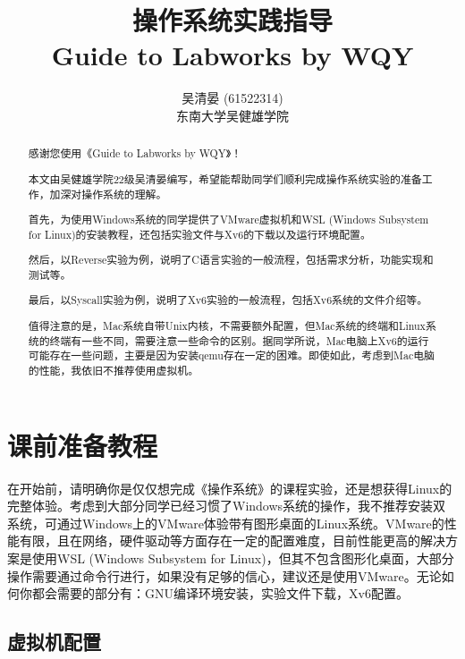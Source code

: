 \documentclass[fontset=ubuntu]{ctexart}
\title{操作系统实践指导 \\ \large Guide to Labworks by WQY}
\author{吴清晏 (61522314) \\ 东南大学吴健雄学院}
\date{}
\begin{document}
\maketitle
\thispagestyle{empty}

\newpage
\renewcommand{\abstractname}{\LARGE\textbf{前言}}
\begin{abstract}\large
    \vspace{1cm}
    \noindent 感谢您使用《Guide to Labworks by WQY》！

    本文由吴健雄学院22级吴清晏编写，希望能帮助同学们顺利完成操作系统实验的准备工作，加深对操作系统的理解。

    首先，为使用Windows系统的同学提供了VMware虚拟机和WSL (Windows Subsystem for Linux)的安装教程，还包括实验文件与Xv6的下载以及运行环境配置。

    然后，以Reverse实验为例，说明了C语言实验的一般流程，包括需求分析，功能实现和测试等。

    最后，以Syscall实验为例，说明了Xv6实验的一般流程，包括Xv6系统的文件介绍等。

    值得注意的是，Mac系统自带Unix内核，不需要额外配置，但Mac系统的终端和Linux系统的终端有一些不同，需要注意一些命令的区别。据同学所说，Mac电脑上Xv6的运行可能存在一些问题，主要是因为安装qemu存在一定的困难。即使如此，考虑到Mac电脑的性能，我依旧不推荐使用虚拟机。

\end{abstract}
\thispagestyle{empty}
\restoregeometry{}

\newpage
\begin{center}
    \tableofcontents
\end{center}
\thispagestyle{empty}

\newpage
{}

\section{课前准备教程}

在开始前，请明确你是仅仅想完成《操作系统》的课程实验，还是想获得Linux的完整体验。考虑到大部分同学已经习惯了Windows系统的操作，我不推荐安装双系统，可通过Windows上的VMware体验带有图形桌面的Linux系统。VMware的性能有限，且在网络，硬件驱动等方面存在一定的配置难度，目前性能更高的解决方案是使用WSL (Windows Subsystem for Linux)，但其不包含图形化桌面，大部分操作需要通过命令行进行，如果没有足够的信心，建议还是使用VMware。无论如何你都会需要的部分有：GNU编译环境安装，实验文件下载，Xv6配置。

\subsection{虚拟机配置}
\end{document}

